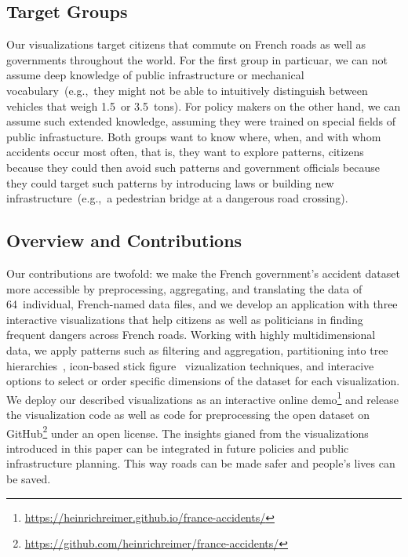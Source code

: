 \subsection{Target Groups}
Our visualizations target citizens that commute on French roads as well as governments throughout the world. For the first group in particuar, we can not assume deep knowledge of public infrastructure or mechanical vocabulary~(e.g.,~they might not be able to intuitively distinguish between vehicles that weigh 1.5~or 3.5~tons). For policy makers on the other hand, we can assume such extended knowledge, assuming they were trained on special fields of public infrastucture. Both groups want to know where, when, and with whom accidents occur most often, that is, they want to explore patterns, citizens because they could then avoid such patterns and government officials because they could target such patterns by introducing laws or building new infrastructure~(e.g.,~a pedestrian bridge at a dangerous road crossing). 

\subsection{Overview and Contributions}
Our contributions are twofold: \Ni we make the French government's accident dataset more accessible by preprocessing, aggregating, and translating the data of 64~individual, French-named data files, and \Nii we develop an application with three interactive visualizations that help citizens as well as politicians in finding frequent dangers across French roads.
Working with highly multidimensional data, we apply patterns such as filtering and aggregation, partitioning into tree hierarchies~\cite{Shneiderman1992}, icon-based stick figure~\cite{PickettG1988} vizualization techniques, and interacive options to select or order specific dimensions of the dataset for each visualization.
We deploy our described visualizations as an interactive online demo\footnote{\url{https://heinrichreimer.github.io/france-accidents/}} and release the visualization code as well as code for preprocessing the open dataset on GitHub\footnote{\url{https://github.com/heinrichreimer/france-accidents/}} under an open license.
The insights gianed from the visualizations introduced in this paper can be integrated in future policies and public infrastructure planning. This way roads can be made safer and people's lives can be saved.

